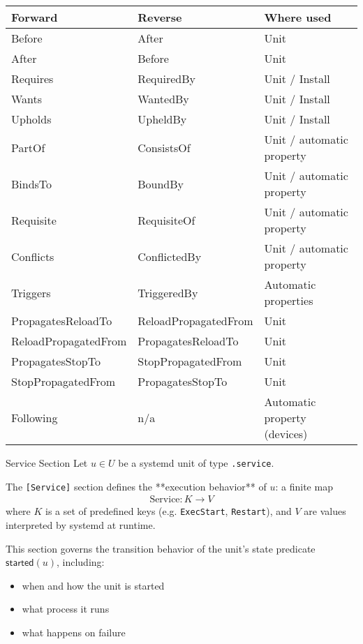 \documentclass[openany, 12pt]{book}
\begin{document}
\begin{tabular}{lll}
  \toprule
  \textbf{Forward}     & \textbf{Reverse}     & \textbf{Where used}          \\
  \midrule
  Before               & After                & Unit                         \\
  After                & Before               & Unit                         \\
  Requires             & RequiredBy           & Unit / Install               \\
  Wants                & WantedBy             & Unit / Install               \\
  Upholds              & UpheldBy             & Unit / Install               \\
  PartOf               & ConsistsOf           & Unit / automatic property    \\
  BindsTo              & BoundBy              & Unit / automatic property    \\
  Requisite            & RequisiteOf          & Unit / automatic property    \\
  Conflicts            & ConflictedBy         & Unit / automatic property    \\
  Triggers             & TriggeredBy          & Automatic properties         \\
  PropagatesReloadTo   & ReloadPropagatedFrom & Unit                         \\
  ReloadPropagatedFrom & PropagatesReloadTo   & Unit                         \\
  PropagatesStopTo     & StopPropagatedFrom   & Unit                         \\
  StopPropagatedFrom   & PropagatesStopTo     & Unit                         \\
  Following            & n/a                  & Automatic property (devices) \\
  \bottomrule
\end{tabular}

\begin{definition}{Service Section}{}
  Let $u \in U$ be a systemd unit of type \texttt{.service}.

  The \texttt{[Service]} section defines the **execution behavior** of $u$:
  a finite map
  \begin{align*}
    \text{Service} : K \to V
  \end{align*}
  where $K$ is a set of predefined keys (e.g. \texttt{ExecStart}, \texttt{Restart}),
  and $V$ are values interpreted by systemd at runtime.

  This section governs the transition behavior of the unit’s state predicate $\mathsf{started}(u)$,
  including:
  \begin{itemize}
    \item when and how the unit is started
    \item what process it runs
    \item what happens on failure
  \end{itemize}
\end{definition}
\end{document}
